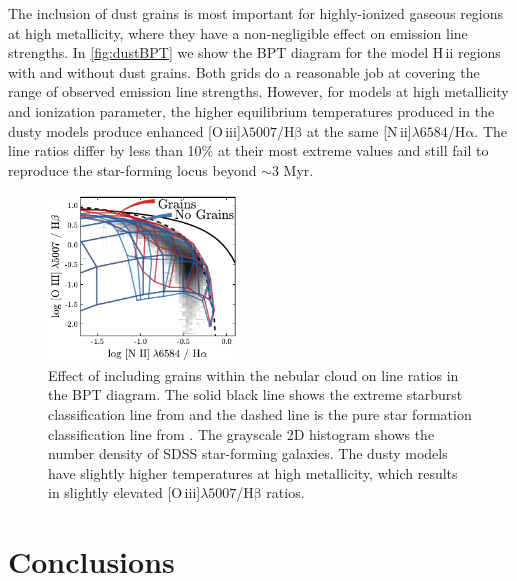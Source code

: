 \documentclass[linenumbers, tighten, trackchanges]{aastex61}%
\newcommand{\Fig}[1]{\autoref{fig:#1}}
\newcommand{\nii}{[N\,{\sc ii}]\xspace}
\newcommand{\oiii}{[O\,{\sc iii}]\xspace}
\newcommand{\ha}{\ensuremath{\mathrm{H\alpha}}}
\newcommand{\hb}{\ensuremath{\mathrm{H\beta}}}
\newcommand{\hii}{H\,{\sc ii}\xspace}
\newcommand\lam[1]{\ensuremath{\lambda #1}}
\newcommand\niiha{\nii{}\lam{6584}/\ha{}}
\newcommand\oiiihb{\oiii{}\lam{5007}/\hb{}}
\begin{document}
The inclusion of dust grains is most important for highly-ionized gaseous regions at high metallicity, where they have a non-negligible effect on emission line strengths. In \Fig{dustBPT} we show the BPT diagram for the model \hii regions with and without dust grains. Both grids do a reasonable job at covering the range of observed emission line strengths. However, for models at high metallicity and ionization parameter, the higher equilibrium temperatures produced in the dusty models produce enhanced \oiiihb{} at the same \niiha{}. The line ratios differ by less than 10\% at their most extreme values and still fail to reproduce the star-forming locus beyond $\sim 3$ Myr. 

\begin{figure}[!htbp]
  \begin{centering}
    \includegraphics[width=0.45\textwidth]{f31.pdf}
    \caption{Effect of including grains within the nebular cloud on line ratios in the BPT diagram. The solid black line shows the extreme starburst classification line from \citet{Kewley01} and the dashed line is the pure star formation classification line from \citet{Kauffmann03a}. The grayscale 2D histogram shows the number density of SDSS star-forming galaxies. The dusty models have slightly higher temperatures at high metallicity, which results in slightly elevated \oiiihb{} ratios.}
    \label{fig:dustBPT}
  \end{centering}
\end{figure}

\section{Conclusions}\label{sec:conclusions}
\end{document}
